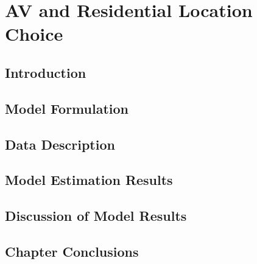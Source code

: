 \chapter{AV and Residential Location Choice}
\section{Introduction}

\section{Model Formulation}

\section{Data Description}

\section{Model Estimation Results}

\section{Discussion of Model Results}

\section{Chapter Conclusions}